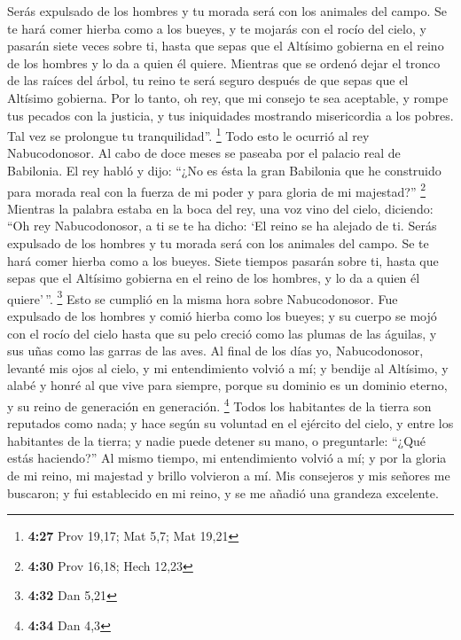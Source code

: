 \begin{paracol}{2}
 Serás expulsado de los hombres y tu morada será con los
animales del campo. Se te hará comer hierba como a los bueyes, y te
mojarás con el rocío del cielo, y pasarán siete veces sobre ti, hasta
que sepas que el Altísimo gobierna en el reino de los hombres y lo da a
quien él quiere.  Mientras que se ordenó dejar el tronco
de las raíces del árbol, tu reino te será seguro después de que sepas
que el Altísimo gobierna.  Por lo tanto, oh rey, que mi
consejo te sea aceptable, y rompe tus pecados con la justicia, y tus
iniquidades mostrando misericordia a los pobres. Tal vez se prolongue tu
tranquilidad''. \footnote{\textbf{4:27} Prov 19,17; Mat 5,7; Mat 19,21}
 Todo esto le ocurrió al rey Nabucodonosor.
 Al cabo de doce meses se paseaba por el palacio real de
Babilonia.  El rey habló y dijo: ``¿No es ésta la gran
Babilonia que he construido para morada real con la fuerza de mi poder y
para gloria de mi majestad?'' \footnote{\textbf{4:30} Prov 16,18; Hech
  12,23}  Mientras la palabra estaba en la boca del rey,
una voz vino del cielo, diciendo: ``Oh rey Nabucodonosor, a ti se te ha
dicho: `El reino se ha alejado de ti.  Serás expulsado de
los hombres y tu morada será con los animales del campo. Se te hará
comer hierba como a los bueyes. Siete tiempos pasarán sobre ti, hasta
que sepas que el Altísimo gobierna en el reino de los hombres, y lo da a
quien él quiere'\,''. \footnote{\textbf{4:32} Dan 5,21} 
Esto se cumplió en la misma hora sobre Nabucodonosor. Fue expulsado de
los hombres y comió hierba como los bueyes; y su cuerpo se mojó con el
rocío del cielo hasta que su pelo creció como las plumas de las águilas,
y sus uñas como las garras de las aves.  Al final de los
días yo, Nabucodonosor, levanté mis ojos al cielo, y mi entendimiento
volvió a mí; y bendije al Altísimo, y alabé y honré al que vive para
siempre, porque su dominio es un dominio eterno, y su reino de
generación en generación. \footnote{\textbf{4:34} Dan 4,3}
 Todos los habitantes de la tierra son reputados como
nada; y hace según su voluntad en el ejército del cielo, y entre los
habitantes de la tierra; y nadie puede detener su mano, o preguntarle:
``¿Qué estás haciendo?''  Al mismo tiempo, mi
entendimiento volvió a mí; y por la gloria de mi reino, mi majestad y
brillo volvieron a mí. Mis consejeros y mis señores me buscaron; y fui
establecido en mi reino, y se me añadió una grandeza excelente.


\end{paracol}
